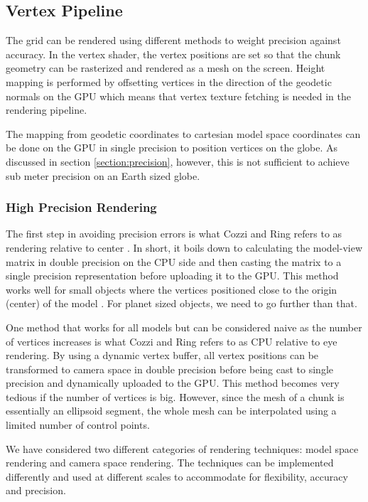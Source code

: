 \subsection{Vertex Pipeline}

The grid can be rendered using different methods to weight precision against accuracy. In the vertex shader, the vertex positions are set so that the chunk geometry can be rasterized and rendered as a mesh on the screen. Height mapping is performed by offsetting vertices in the direction of the geodetic normals on the GPU which means that vertex texture fetching is needed in the rendering pipeline.

The mapping from geodetic coordinates to cartesian model space coordinates can be done on the GPU in single precision to position vertices on the globe. As discussed in section \ref{section:precision}, however, this is not sufficient to achieve sub meter precision on an Earth sized globe.

\subsubsection{High Precision Rendering}

The first step in avoiding precision errors is what Cozzi and Ring refers to as rendering relative to center \cite{cozzi11}. In short, it boils down to calculating the model-view matrix in double precision on the CPU side and then casting the matrix to a single precision representation before uploading it to the GPU. This method works well for small objects where the vertices positioned close to the origin (center) of the model \cite{cozzi11}. For planet sized objects, we need to go further than that.

One method that works for all models but can be considered naive as the number of vertices increases is what Cozzi and Ring refers to as CPU relative to eye rendering. By using a dynamic vertex buffer, all vertex positions can be transformed to camera space in double precision before being cast to single precision and dynamically uploaded to the GPU. This method becomes very tedious if the number of vertices is big. However, since the mesh of a chunk is essentially an ellipsoid segment, the whole mesh can be interpolated using a limited number of control points.

We have considered two different categories of rendering techniques: model space rendering and camera space rendering. The techniques can be implemented differently and used at different scales to accommodate for flexibility, accuracy and precision.

